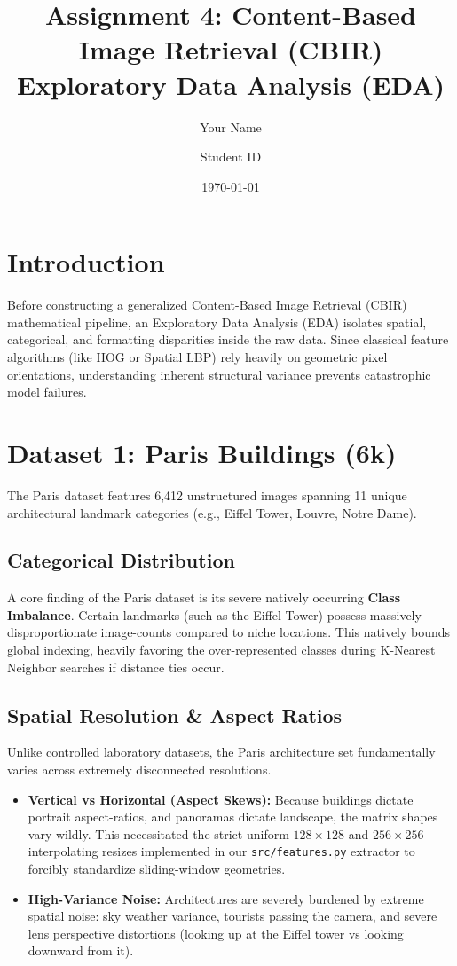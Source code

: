 \documentclass[11pt, a4paper]{article}
\title{Assignment 4: Content-Based Image Retrieval (CBIR) \\ \large Exploratory Data Analysis (EDA)}
\author{Your Name \and Student ID}
\date{\today}
\begin{document}
\maketitle

\section{Introduction}
Before constructing a generalized Content-Based Image Retrieval (CBIR) mathematical pipeline, an Exploratory Data Analysis (EDA) isolates spatial, categorical, and formatting disparities inside the raw data. Since classical feature algorithms (like HOG or Spatial LBP) rely heavily on geometric pixel orientations, understanding inherent structural variance prevents catastrophic model failures.

\section{Dataset 1: Paris Buildings (6k)}
The Paris dataset features 6,412 unstructured images spanning 11 unique architectural landmark categories (e.g., Eiffel Tower, Louvre, Notre Dame).

\subsection{Categorical Distribution}
A core finding of the Paris dataset is its severe natively occurring \textbf{Class Imbalance}. Certain landmarks (such as the Eiffel Tower) possess massively disproportionate image-counts compared to niche locations. This natively bounds global indexing, heavily favoring the over-represented classes during K-Nearest Neighbor searches if distance ties occur.

\subsection{Spatial Resolution & Aspect Ratios}
Unlike controlled laboratory datasets, the Paris architecture set fundamentally varies across extremely disconnected resolutions. 
\begin{itemize}
    \item \textbf{Vertical vs Horizontal (Aspect Skews):} Because buildings dictate portrait aspect-ratios, and panoramas dictate landscape, the matrix shapes vary wildly. This necessitated the strict uniform $128 \times 128$ and $256 \times 256$ interpolating resizes implemented in our \texttt{src/features.py} extractor to forcibly standardize sliding-window geometries.
    \item \textbf{High-Variance Noise:} Architectures are severely burdened by extreme spatial noise: sky weather variance, tourists passing the camera, and severe lens perspective distortions (looking up at the Eiffel tower vs looking downward from it).
\end{itemize}
\end{document}

